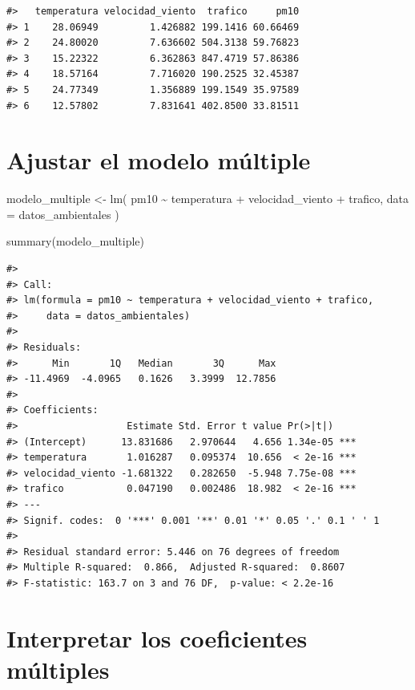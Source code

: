 \documentclass[
  spanish,
  10.5pt,
  letterpaper,
  openany,
  headings=big]{scrbook}
\newenvironment{Shaded}{}{}
\newcommand{\AttributeTok}[1]{\textcolor[rgb]{0.84,0.23,0.29}{#1}}
\newcommand{\FunctionTok}[1]{\textcolor[rgb]{0.44,0.26,0.76}{#1}}
\newcommand{\NormalTok}[1]{\textcolor[rgb]{0.14,0.16,0.18}{#1}}
\newcommand{\OtherTok}[1]{\textcolor[rgb]{0.44,0.26,0.76}{#1}}
\newcommand{\SpecialCharTok}[1]{\textcolor[rgb]{0.00,0.36,0.77}{#1}}
\begin{document}
\begin{verbatim}
#>   temperatura velocidad_viento  trafico     pm10
#> 1    28.06949         1.426882 199.1416 60.66469
#> 2    24.80020         7.636602 504.3138 59.76823
#> 3    15.22322         6.362863 847.4719 57.86386
#> 4    18.57164         7.716020 190.2525 32.45387
#> 5    24.77349         1.356889 199.1549 35.97589
#> 6    12.57802         7.831641 402.8500 33.81511
\end{verbatim}

\section{Ajustar el modelo
múltiple}\label{ajustar-el-modelo-muxfaltiple}

\begin{Shaded}
\begin{Highlighting}[]
\NormalTok{modelo\_multiple }\OtherTok{\textless{}{-}} \FunctionTok{lm}\NormalTok{(}
\NormalTok{  pm10 }\SpecialCharTok{\textasciitilde{}}\NormalTok{ temperatura }\SpecialCharTok{+}\NormalTok{ velocidad\_viento }\SpecialCharTok{+}\NormalTok{ trafico,}
  \AttributeTok{data =}\NormalTok{ datos\_ambientales}
\NormalTok{)}

\FunctionTok{summary}\NormalTok{(modelo\_multiple)}
\end{Highlighting}
\end{Shaded}

\begin{verbatim}
#> 
#> Call:
#> lm(formula = pm10 ~ temperatura + velocidad_viento + trafico, 
#>     data = datos_ambientales)
#> 
#> Residuals:
#>      Min       1Q   Median       3Q      Max 
#> -11.4969  -4.0965   0.1626   3.3999  12.7856 
#> 
#> Coefficients:
#>                   Estimate Std. Error t value Pr(>|t|)    
#> (Intercept)      13.831686   2.970644   4.656 1.34e-05 ***
#> temperatura       1.016287   0.095374  10.656  < 2e-16 ***
#> velocidad_viento -1.681322   0.282650  -5.948 7.75e-08 ***
#> trafico           0.047190   0.002486  18.982  < 2e-16 ***
#> ---
#> Signif. codes:  0 '***' 0.001 '**' 0.01 '*' 0.05 '.' 0.1 ' ' 1
#> 
#> Residual standard error: 5.446 on 76 degrees of freedom
#> Multiple R-squared:  0.866,  Adjusted R-squared:  0.8607 
#> F-statistic: 163.7 on 3 and 76 DF,  p-value: < 2.2e-16
\end{verbatim}

\section{Interpretar los coeficientes
múltiples}\label{interpretar-los-coeficientes-muxfaltiples}
\end{document}
